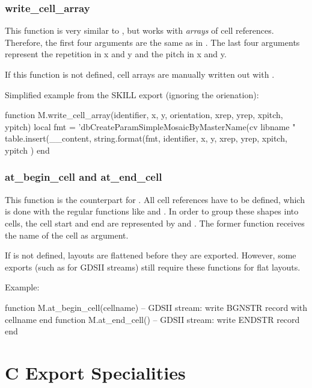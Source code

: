 \subsubsection{write\_cell\_array}
This function is very similar to , but works with \emph{arrays} of cell references.
Therefore, the first four arguments are the same as in .
The last four arguments represent the repetition in x and y and the pitch in x and y.

If this function is not defined, cell arrays are manually written out with .

Simplified example from the SKILL export (ignoring the orienation):
\begin{lualisting}
    function M.write_cell_array(identifier, x, y, orientation, xrep, yrep, xpitch, ypitch)
        local fmt = 'dbCreateParamSimpleMosaicByMasterName(cv libname "%
        table.insert(__content, string.format(fmt,
            identifier,
            x, y,
            xrep, yrep, xpitch, ypitch
        )
    end
\end{lualisting}

\subsubsection{at\_begin\_cell and at\_end\_cell}
This function is the counterpart for .
All cell references have to be defined, which is done with the regular functions like  and .
In order to group these shapes into cells, the cell start and end are represented by  and .
The former function receives the name of the cell as argument.

If  is not defined, layouts are flattened before they are exported.
However, some exports (such as for GDSII streams) still require these functions for flat layouts.

Example:
\begin{lualisting}
    function M.at_begin_cell(cellname)
        -- GDSII stream: write BGNSTR record with cellname
    end
    function M.at_end_cell()
        -- GDSII stream: write ENDSTR record
    end
\end{lualisting}

\section{C Export Specialities}\label{sec:cspecial}



